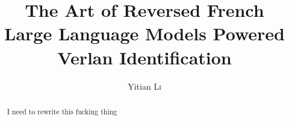 \documentclass[12pt]{article}
\title{The Art of Reversed French\\\large Large Language Models Powered Verlan Identification}
\author{Yitian \textsc{Li}}
\begin{document}
\maketitle

\begin{abstract}
I need to rewrite this fucking thing

\end{abstract}
\end{document}
